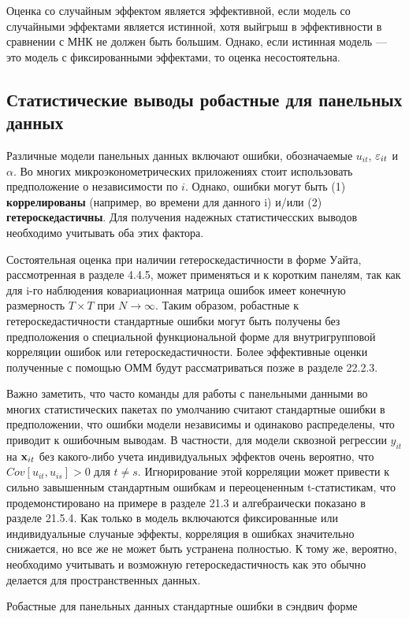 Оценка со случайным эффектом является эффективной, если модель со случайными эффектами является истинной, хотя выйгрыш в эффективности в сравнении с МНК не должен быть большим. Однако, если истинная модель --- это модель с фиксированными эффектами, то оценка несостоятельна.

\subsection{Статистические выводы робастные для панельных данных}
Различные модели панельных данных включают ошибки, обозначаемые $u_{it}$, $\varepsilon_{it}$ и $\alpha$. Во многих микроэконометрических приложениях стоит использовать предположение о независимости по $i$. Однако, ошибки могут быть (1) \textbf{коррелированы} (например, во времени для данного i) и/или (2) \textbf{гетероскедастичны}. Для получения надежных статистичесских выводов необходимо учитывать оба этих фактора.

Состоятельная оценка при наличии гетероскедастичности в форме Уайта, рассмотренная в разделе 4.4.5, может применяться и к коротким панелям, так как для i-го наблюдения ковариационная матрица ошибок имеет конечную размерность $T\times T$ при $N \rightarrow \infty$. Таким образом, робастные к гетероскедастичности стандартные ошибки могут быть получены без предположения о специальной функциональной форме для внутригрупповой корреляции ошибок или гетероскедастичности. Более эффективные оценки полученные с помощью ОММ будут рассматриваться позже в разделе 22.2.3. 

Важно заметить, что часто команды для работы с панельными данными во многих статистических пакетах по умолчанию считают стандартные ошибки в предположении, что ошибки модели независимы и одинаково распределены, что приводит к ошибочным выводам. В частности, для модели сквозной регрессии $y_{it}$ на $\mathbf{x}_{it}$ без какого-либо учета индивидуальных эффектов очень вероятно, что $Cov[u_{it}, u_{is}] > 0$ для $t \neq s$. Игнорирование этой корреляции может привести к сильно завышенным стандартным ошибкам и переоцененным t-статистикам, что продемонстировано на примере в разделе 21.3 и алгебраически показано в разделе 21.5.4. Как только в модель включаются фиксированные или индивидуальные случаные эффекты, корреляция в ошибках значительно снижается, но все же не может быть устранена полностью.
К тому же, вероятно, необходимо учитывать и возможную гетероскедастичность как это обычно делается для пространственных данных.
 
{\centering
Робастные для панельных данных стандартные ошибки в сэндвич форме\\}

